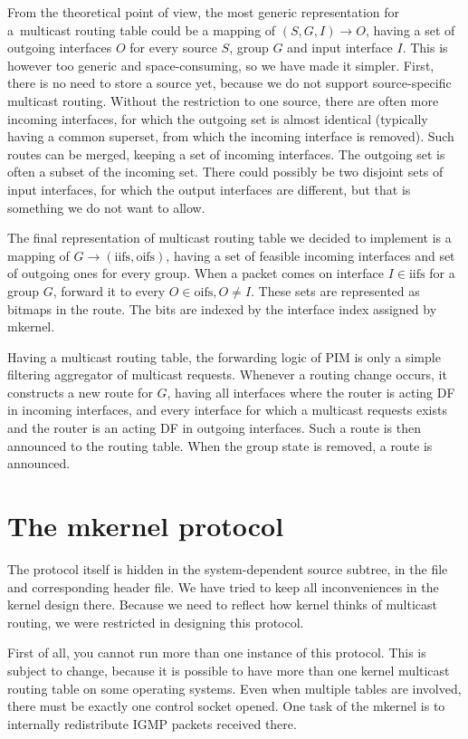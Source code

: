 From the theoretical point of view, the most generic representation for
a~multicast routing table could be a mapping of $(S, G, I) \rightarrow O$,
having a set of outgoing interfaces $O$ for every source $S$, group $G$ and
input interface $I$. This is however too generic and space-consuming, so we
have made it simpler. First, there is no need to store a source yet, because we
do not support source-specific multicast routing. Without the restriction to
one source, there are often more incoming interfaces, for which the outgoing
set is almost identical (typically having a common superset, from which the
incoming interface is removed). Such routes can be merged, keeping a set of
incoming interfaces. The outgoing set is often a subset of the incoming set.
There could possibly be two disjoint sets of input interfaces, for which the
output interfaces are different, but that is something we do not want to allow.

The final representation of multicast routing table we decided to implement is
a mapping of $G \rightarrow (\mathrm{iifs}, \mathrm{oifs})$, having a set of feasible incoming
interfaces and set of outgoing ones for every group. When a packet comes on
interface $I \in \mathrm{iifs}$ for a group $G$, forward it to every $O \in \mathrm{oifs}, O \neq I$.
These sets are represented as bitmaps in the route. The bits are indexed by the
interface index assigned by mkernel.

Having a multicast routing table, the forwarding logic of PIM is only a simple
filtering aggregator of multicast requests. Whenever a routing change occurs,
it constructs a new route for $G$, having all interfaces where the router is
acting DF in incoming interfaces, and every interface for which a multicast
requests exists and the router is an acting DF in outgoing interfaces. Such
a route is then announced to the routing table. When the group state is
removed, a \NULL{} route is announced.

\section{The mkernel protocol}
The protocol itself is hidden in the system-dependent source subtree, in the
file  and corresponding header file. We have tried to
keep all inconveniences in the
kernel design there. Because we need to reflect how kernel thinks of multicast
routing, we were restricted in designing this protocol.

First of all, you cannot run more than one instance of this protocol. This is
subject to change, because it is possible to have more than one kernel
multicast routing table on some operating systems. Even when multiple tables
are involved, there must be exactly one control socket opened. One task of the
mkernel is to internally redistribute IGMP packets received there.

